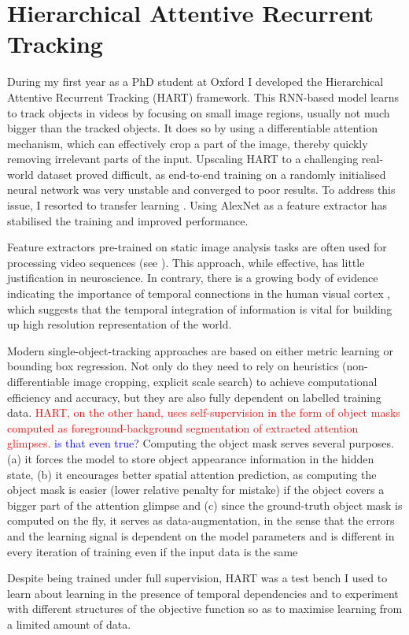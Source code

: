 \section{Hierarchical Attentive Recurrent Tracking}
\label{sec:done}

    During my first year as a PhD student at Oxford I developed the Hierarchical Attentive Recurrent Tracking (HART) framework. This RNN-based model learns to track objects in videos by focusing on small image regions, usually not much bigger than the tracked objects. It does so by using a differentiable attention mechanism, which can effectively crop a part of the image, thereby quickly removing irrelevant parts of the input.
    Upscaling HART to a challenging real-world dataset proved difficult, as end-to-end training on a randomly initialised neural network was very unstable and converged to poor results. To address this issue, I resorted to transfer learning \citep{Pan2010}. Using AlexNet \citep{Krizhevsky2012} as a feature extractor has stabilised the training and improved performance.
    
    Feature extractors pre-trained on static image analysis tasks are often used for processing video sequences (see \eg \cite{Ning2016a}). This approach, while effective, has little justification in neuroscience. In contrary, there is a growing body of evidence indicating the importance of temporal connections in the human visual cortex \citep{Ungerleider2000}, which suggests that the temporal integration of information is vital for building up high resolution representation of the world.   
    
    Modern single-object-tracking approaches are based on either metric learning or bounding box regression. Not only do they need to rely on heuristics (non-differentiable image cropping, explicit scale search) to achieve computational efficiency and accuracy, but they are also fully dependent on labelled training data. \textcolor{red}{HART, on the other hand, uses self-supervision in the form of object masks computed as foreground-background segmentation of extracted attention glimpses.} \textcolor{blue}{is that even true?} Computing the object mask serves several purposes. (a) it forces the model to store object appearance information in the hidden state, (b) it encourages better spatial attention prediction, as computing the object mask is easier (lower relative penalty for mistake) if the object covers a bigger part of the attention glimpse and (c) since the ground-truth object mask is computed on the fly, it serves as data-augmentation, in the sense that the errors and the learning signal is dependent on the model parameters and is different in every iteration of training even if the input data is the same
    
    Despite being trained under full supervision, HART was a test bench I used to learn about learning in the presence of temporal dependencies and to experiment  with different structures of the objective function so as to maximise learning from a limited amount of data.